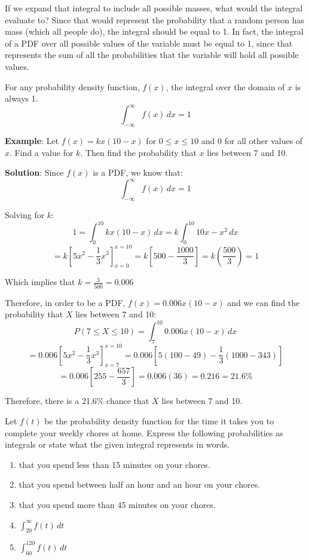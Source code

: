 If we expand that integral to include all possible masses, what would the 
integral evaluate to? Since that would represent the probability that a random 
person has mass (which all people do), the integral should be equal to 1. In 
fact, the integral of a PDF over all possible values of the variable must be 
equal to 1, since that represents the sum of all the probabilities that the 
variable will hold all possible values. 

\begin{mdframed}[style = important]
For any probability density function, $f(x)$, the integral over the domain of 
$x$ is always 1.
$$\int_{-\infty}^{\infty} f(x)\,dx = 1$$
\end{mdframed} 

\textbf{Example}: Let $f(x) = kx(10-x)$ for $0 \leq x \leq 10$ and $0$ for all 
other values of $x$. Find a value for $k$. Then find the probability that $x$ 
lies between 7 and 10. 

\textbf{Solution}: Since $f(x)$ is a PDF, we know that:
$$\int_{-\infty}^{\infty} f(x)\,dx = 1$$

Solving for $k$:
$$1 = \int_{0}^{10} kx(10-x)\,dx = k\int_0^{10} 10x - x^2\,dx$$
$$= k \left[5x^2 - \frac{1}{3}x^3 \right]_{x = 0}^{x = 10} = k\left[500 - 
\frac{1000}{3} \right] = k \left( \frac{500}{3} \right) = 1$$

Which implies that $k = \frac{3}{500} = 0.006$

Therefore, in order to be a PDF, $f(x) = 0.006x(10-x)$ and we can find the 
probability that $X$ lies between 7 and 10:
$$P(7 \leq X \leq 10) = \int_7^{10} 0.006x(10 - x)\,dx$$
$$= 0.006 \left[5x^2 - \frac{1}{3}x^3 \right]_{x = 7}^{x = 10} = 0.006 \left[ 
5 \left(100 - 49 \right) - \frac{1}{3} \left(1000 - 343 \right) \right]$$
$$= 0.006 \left[ 255 - \frac{657}{3} \right] = 0.006(36) = 0.216 = 21.6\%$$

Therefore, there is a 21.6\% chance that $X$ lies between 7 and 10. 

\begin{Exercise}[title = {Representing Probabilities as Integrals}, 
label = rep_int]
Let $f(t)$ be the probability density function for the time it takes you to 
complete your weekly chores at home. Express the following probabilities as 
integrals or state what the given integral represents in words. 
\begin{enumerate}
\item that you spend less than 15 minutes on your chores.
\item that you spend between half an hour and an hour on your chores.
\item that you spend more than 45 minutes on your chores. 
\item $\int_{20}^{\infty} f(t)\,dt$
\item $\int_{60}^{120} f(t)\,dt$
\end{enumerate}
\end{Exercise}

